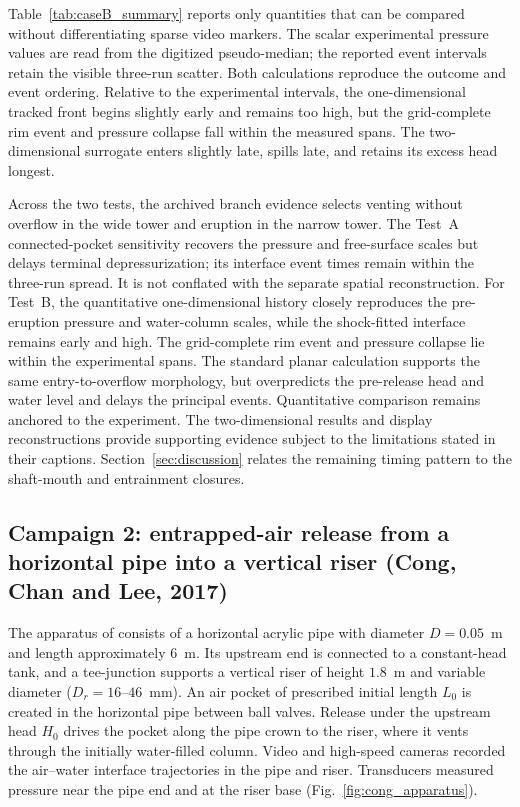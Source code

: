 Table~\ref{tab:caseB_summary} reports only quantities that can be compared
without differentiating sparse video markers. The scalar experimental
pressure values are read from the digitized pseudo-median; the reported event
intervals retain the visible three-run scatter. Both calculations reproduce
the outcome and event ordering. Relative to the experimental intervals, the
one-dimensional tracked front begins slightly early and remains too high, but
the grid-complete rim event and pressure collapse fall within the measured
spans. The two-dimensional surrogate enters slightly late, spills late, and
retains its excess head longest.

\FloatBarrier

Across the two tests, the archived branch evidence selects venting without
overflow in the wide tower and eruption in the narrow tower. The Test~A
connected-pocket sensitivity recovers the pressure and free-surface scales but
delays terminal depressurization; its interface event times remain within the
three-run spread. It is not conflated with the
separate spatial reconstruction. For Test~B, the quantitative one-dimensional
history closely reproduces the pre-eruption pressure and water-column scales,
while the shock-fitted interface remains early and high. The grid-complete
rim event and pressure collapse lie within the experimental spans.
The standard planar calculation supports the same entry-to-overflow morphology,
but overpredicts the pre-release head and water level and delays the principal
events. Quantitative comparison remains anchored to the experiment. The
two-dimensional results and display reconstructions provide supporting evidence
subject to the limitations stated in their captions. Section~\ref{sec:discussion}
relates the remaining timing pattern to the shaft-mouth and entrainment
closures.

\FloatBarrier

\subsection{Campaign 2: entrapped-air release from a horizontal pipe into a
vertical riser (Cong, Chan and Lee, 2017)}
\label{sec:tests:cong2017}

The apparatus of \cite{cong2017} consists of a horizontal acrylic pipe with
diameter $D=0.05$~m and length approximately $6$~m. Its upstream end is
connected to a constant-head tank, and a tee-junction supports a vertical riser
of height $1.8$~m and variable diameter ($D_r=16$--$46$~mm). An air pocket of
prescribed initial length $L_0$ is created in the horizontal pipe between ball
valves. Release under the upstream head $H_0$ drives the pocket along the pipe
crown to the riser, where it vents through the initially water-filled column.
Video and high-speed cameras recorded the air--water interface trajectories in
the pipe and riser. Transducers measured pressure near the pipe end and at the
riser base (Fig.~\ref{fig:cong_apparatus}).

